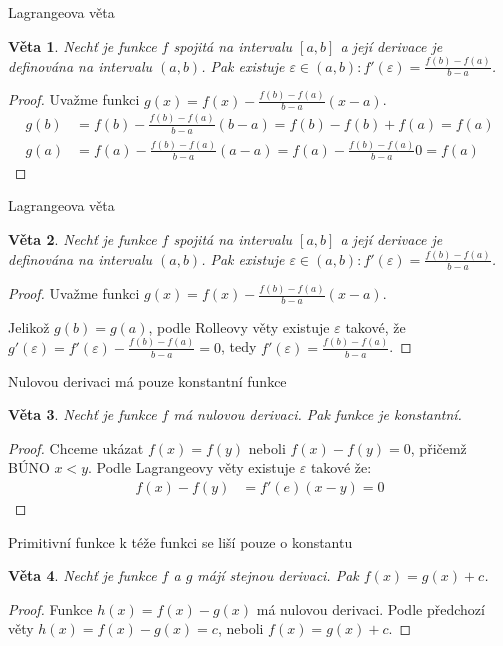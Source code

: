 \documentclass{beamer}
\newtheorem{thm}{Věta}
\theoremstyle{definition}
\theoremstyle{example}
\begin{document}
\begin{frame}{Lagrangeova věta}
	\begin{thm}
		Nechť je funkce $f$ spojitá na intervalu $[a, b]$ a její derivace je definována na intervalu $(a, b)$. Pak existuje $\varepsilon\in (a, b): f'(\varepsilon) = \frac{f(b) - f(a)}{b - a}$.
	\end{thm}
	\pause
	\begin{proof}\renewcommand{\qedsymbol}{}
		Uvažme funkci $g(x) = f(x) - \frac{f(b) - f(a)}{b - a}(x - a)$. 
		\begin{align*}
			g(b) &= f(b) - \frac{f(b) - f(a)}{b - a}(b - a) = f(b) - f(b) + f(a) = f(a)\\
			g(a) &= f(a) - \frac{f(b) - f(a)}{b - a}(a - a) = f(a) - \frac{f(b) - f(a)}{b - a}0 = f(a)
		\end{align*}
	\end{proof}
\end{frame}
\begin{frame}{Lagrangeova věta}
	\begin{thm}
		Nechť je funkce $f$ spojitá na intervalu $[a, b]$ a její derivace je definována na intervalu $(a, b)$. Pak existuje $\varepsilon\in (a, b): f'(\varepsilon) = \frac{f(b) - f(a)}{b - a}$.
	\end{thm}
	\begin{proof}
		Uvažme funkci $g(x) = f(x) - \frac{f(b) - f(a)}{b - a}(x - a)$.

		Jelikož $g(b) = g(a)$, podle Rolleovy věty existuje $\varepsilon$ takové, že $g'(\varepsilon) = f'(\varepsilon) - \frac{f(b) - f(a)}{b - a} = 0$, tedy $f'(\varepsilon) = \frac{f(b) - f(a)}{b - a}$.
	\end{proof}
\end{frame}

\begin{frame}{Nulovou derivaci má pouze konstantní funkce}
	\begin{thm}
		Nechť je funkce $f$ má nulovou derivaci. Pak funkce je konstantní.
	\end{thm}
	\pause
	\begin{proof}
		Chceme ukázat $f(x) = f(y)$ neboli $f(x) - f(y) = 0$, přičemž BÚNO $x < y$. Podle Lagrangeovy věty existuje $\varepsilon$ takové že:
		\begin{align*}
			f(x) - f(y) &= f'(e)(x - y) = 0
		\end{align*}
	\end{proof}
\end{frame}

\begin{frame}{Primitivní funkce k téže funkci se liší pouze o konstantu}
	\begin{thm}
		Nechť je funkce $f$ a $g$ májí stejnou derivaci. Pak $f(x) = g(x) + c$.
	\end{thm}
	\begin{proof}
		Funkce $h(x) = f(x) - g(x)$ má nulovou derivaci. Podle předchozí věty $h(x) = f(x) - g(x) = c$, neboli $f(x) = g(x) + c$.
	\end{proof}
\end{frame}
\end{document}
